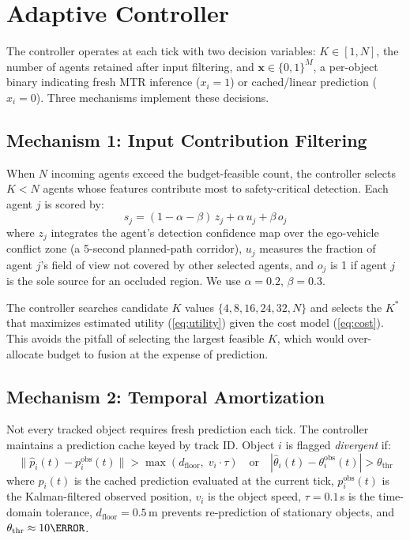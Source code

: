 \section{Adaptive Controller}
\label{sec:controller}

The controller operates at each tick with two decision variables:
$K \in [1, N]$, the number of agents retained after input filtering,
and $\mathbf{x} \in \{0,1\}^M$, a per-object binary indicating fresh
MTR inference ($x_i=1$) or cached/linear prediction ($x_i=0$).
Three mechanisms implement these decisions.

\subsection{Mechanism 1: Input Contribution Filtering}

When $N$ incoming agents exceed the budget-feasible count, the
controller selects $K < N$ agents whose features contribute most to
safety-critical detection.  Each agent $j$ is scored by:
\begin{equation}
  s_j = (1-\alpha-\beta)\,z_j + \alpha\,u_j + \beta\,o_j
  \label{eq:contrib}
\end{equation}
where $z_j$ integrates the agent's detection confidence map over the
ego-vehicle conflict zone (a 5-second planned-path corridor),
$u_j$ measures the fraction of agent $j$'s field of view not covered by
other selected agents, and $o_j$ is 1 if agent $j$ is the sole source
for an occluded region.  We use $\alpha{=}0.2$, $\beta{=}0.3$.

The controller searches candidate $K$ values $\{4, 8, 16, 24, 32, N\}$
and selects the $K^*$ that maximizes estimated utility
(\cref{eq:utility}) given the cost model (\cref{eq:cost}).
This avoids the pitfall of selecting the largest feasible $K$, which
would over-allocate budget to fusion at the expense of prediction.

\subsection{Mechanism 2: Temporal Amortization}

Not every tracked object requires fresh prediction each tick.
The controller maintains a prediction cache keyed by track ID.
Object $i$ is flagged \emph{divergent} if:
\begin{equation}
  \|\hat{p}_i(t) - p_i^{\mathrm{obs}}(t)\| >
    \max\!\left(d_{\mathrm{floor}},\; v_i \cdot \tau\right)
  \quad\text{or}\quad
  |\hat{\theta}_i(t) - \theta_i^{\mathrm{obs}}(t)| > \theta_{\mathrm{thr}}
  \label{eq:divergence}
\end{equation}
where $\hat{p}_i(t)$ is the cached prediction evaluated at the
current tick, $p_i^{\mathrm{obs}}(t)$ is the Kalman-filtered observed
position, $v_i$ is the object speed, $\tau = 0.1\,$s is the
time-domain tolerance, $d_{\mathrm{floor}} = 0.5\,$m prevents
re-prediction of stationary objects, and $\theta_{\mathrm{thr}}
\approx 10\degree$.

